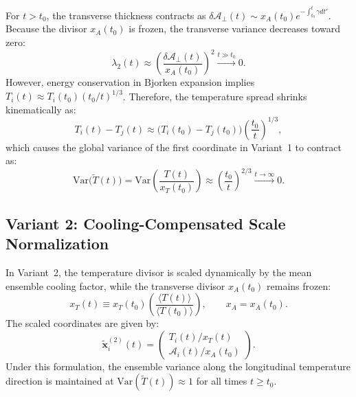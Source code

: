 \documentclass[11pt,a4paper]{article}
\begin{document}
For $t > t_0$, the transverse thickness contracts as $\delta\mathcal{A}_\perp(t) \sim x_A(t_0) e^{-\int_{t_0}^t \gamma dt'}$. Because the divisor $x_A(t_0)$ is frozen, the transverse variance decreases toward zero:
\begin{equation}
    \lambda_2(t) \approx \left(\frac{\delta\mathcal{A}_\perp(t)}{x_A(t_0)}\right)^2 \xrightarrow{t \gg t_0} 0.
\end{equation}
However, energy conservation in Bjorken expansion implies $T_i(t) \approx T_i(t_0) (t_0/t)^{1/3}$. Therefore, the temperature spread shrinks kinematically as:
\begin{equation}
    T_i(t) - T_j(t) \approx \big(T_i(t_0) - T_j(t_0)\big) \left(\frac{t_0}{t}\right)^{1/3},
\end{equation}
which causes the global variance of the first coordinate in Variant~1 to contract as:
\begin{equation}
    \mathrm{Var}\big(\tilde{T}(t)\big) = \mathrm{Var}\left(\frac{T(t)}{x_T(t_0)}\right) \approx \left(\frac{t_0}{t}\right)^{2/3} \xrightarrow{t \to \infty} 0.
\end{equation}

\subsection{Variant 2: Cooling-Compensated Scale Normalization}
In Variant~2, the temperature divisor is scaled dynamically by the mean ensemble cooling factor, while the transverse divisor $x_A(t_0)$ remains frozen:
\begin{equation}
    x_T(t) \equiv x_T(t_0) \left( \frac{\langle T(t) \rangle}{\langle T(t_0) \rangle} \right), \qquad x_A = x_A(t_0).
\end{equation}
The scaled coordinates are given by:
\begin{equation}
    \tilde{\mathbf{x}}_i^{(2)}(t) = \begin{pmatrix} T_i(t) / x_T(t) \\ \mathcal{A}_i(t) / x_A(t_0) \end{pmatrix}.
    \label{eq:var2_def}
\end{equation}
Under this formulation, the ensemble variance along the longitudinal temperature direction is maintained at $\mathrm{Var}(\tilde{T}(t)) \approx 1$ for all times $t \ge t_0$.
\end{document}
